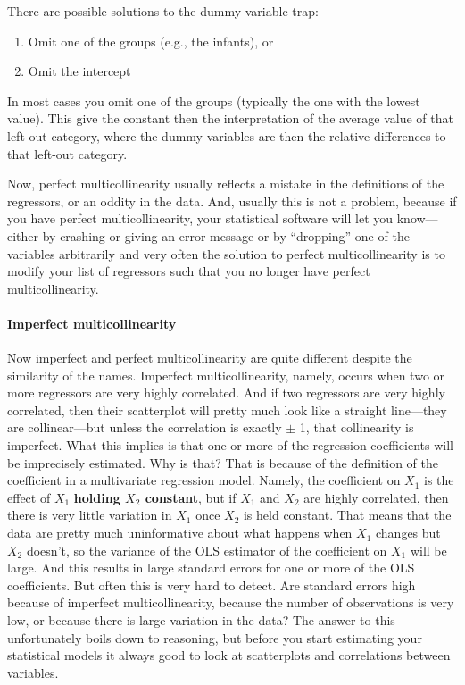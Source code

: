 \documentclass[
]{book}
\providecommand{\tightlist}{%
  \setlength{\itemsep}{0pt}\setlength{\parskip}{0pt}}
\begin{document}
There are possible solutions to the dummy variable trap:

\begin{enumerate}
\def\labelenumi{\arabic{enumi}.}
\tightlist
\item
  Omit one of the groups (e.g., the infants), or
\item
  Omit the intercept
\end{enumerate}

In most cases you omit one of the groups (typically the one with the lowest value). This give the constant then the interpretation of the average value of that left-out category, where the dummy variables are then the relative differences to that left-out category.

Now, perfect multicollinearity usually reflects a mistake in the definitions of the regressors, or an oddity in the data. And, usually this is not a problem, because if you have perfect multicollinearity, your statistical software will let you know---either by crashing or giving an error message or by ``dropping'' one of the variables arbitrarily and very often the solution to perfect multicollinearity is to modify your list of regressors such that you no longer have perfect multicollinearity.

\hypertarget{imperfect-multicollinearity}{%
\paragraph{Imperfect multicollinearity}\label{imperfect-multicollinearity}}

Now imperfect and perfect multicollinearity are quite different despite the similarity of the names. Imperfect multicollinearity, namely, occurs when two or more regressors are very highly correlated. And if two regressors are very highly correlated, then their scatterplot will pretty much look like a straight line---they are collinear---but unless the correlation is exactly \(\pm\) 1, that collinearity is imperfect. What this implies is that one or more of the regression coefficients will be imprecisely estimated. Why is that? That is because of the definition of the coefficient in a multivariate regression model. Namely, the coefficient on \(X_1\) is the effect of \(X_1\) \textbf{holding \(X_2\) constant}, but if \(X_1\) and \(X_2\) are highly correlated, then there is very little variation in \(X_1\) once \(X_2\) is held constant. That means that the data are pretty much uninformative about what happens when \(X_1\) changes but \(X_2\) doesn't, so the variance of the OLS estimator of the coefficient on \(X_1\) will be large. And this results in large standard errors for one or more of the OLS coefficients. But often this is very hard to detect. Are standard errors high because of imperfect multicollinearity, because the number of observations is very low, or because there is large variation in the data? The answer to this unfortunately boils down to reasoning, but before you start estimating your statistical models it always good to look at scatterplots and correlations between variables.
\end{document}
